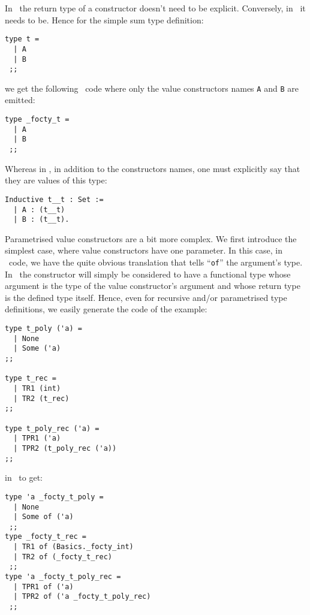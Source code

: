 In \ocaml\ the return type of a constructor doesn't need to be
explicit. Conversely, in \coq\ it needs to be. Hence for the simple
sum type definition:

{\footnotesize
\begin{lstlisting}[title=Simple sum type in \focalize]
type t =
  | A
  | B
 ;;
\end{lstlisting}}

\noindent we get the following \ocaml\ code where only the value constructors
names {\tt A} and {\tt B} are emitted:

{\footnotesize
\begin{lstlisting}[language=MyOCaml,
                   title=Simple sum type generated in \ocaml]
type _focty_t = 
  | A
  | B
 ;;
\end{lstlisting}}

Whereas in \coq, in addition to the constructors names, one must
explicitly say that they are values of this type:

{\footnotesize
\begin{lstlisting}[language=MyCoq,
                   title=Simple sum type generated in \coq]
Inductive t__t : Set := 
  | A : (t__t)
  | B : (t__t).
\end{lstlisting}}

\medskip
Parametrised value constructors are a bit more complex. We first
introduce the simplest case, where value constructors have one
parameter. In this case, in \ocaml\ code, we have the quite obvious
translation that tells ``{\tt of}'' the argument's type. In \coq\,
the constructor will simply be considered to have a functional type
whose argument is the type of the value constructor's argument and
whose return type is the defined type itself.
Hence, even for recursive and/or parametrised type definitions, we
easily generate the code of the example:

{\footnotesize
\begin{lstlisting}[title=Sum types with simply parametrised value
  constructors]
type t_poly ('a) =
  | None
  | Some ('a)
;;

type t_rec =
  | TR1 (int)
  | TR2 (t_rec)
;;

type t_poly_rec ('a) =
  | TPR1 ('a)
  | TPR2 (t_poly_rec ('a))
;;
\end{lstlisting}}

\noindent in \ocaml\ to get:

{\footnotesize
\begin{lstlisting}[language=MyOCaml, title=Sum type generated in \ocaml]
type 'a _focty_t_poly = 
  | None
  | Some of ('a)
 ;;
type _focty_t_rec = 
  | TR1 of (Basics._focty_int)
  | TR2 of (_focty_t_rec)
 ;;
type 'a _focty_t_poly_rec = 
  | TPR1 of ('a)
  | TPR2 of ('a _focty_t_poly_rec)
 ;;
\end{lstlisting}}

